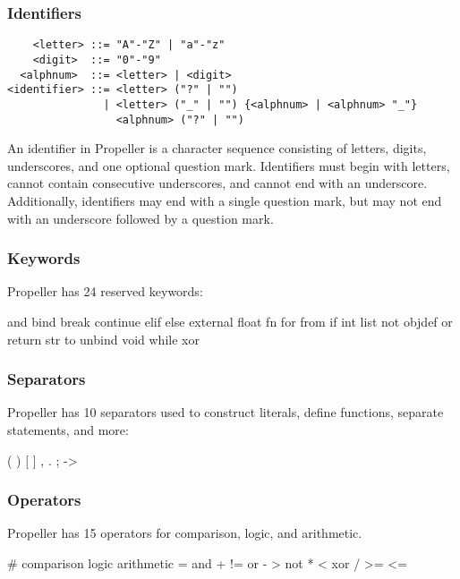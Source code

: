 \subsubsection{Identifiers}

\begin{verbatim}
    <letter> ::= "A"-"Z" | "a"-"z"
    <digit>  ::= "0"-"9"
  <alphnum>  ::= <letter> | <digit>
<identifier> ::= <letter> ("?" | "")
               | <letter> ("_" | "") {<alphnum> | <alphnum> "_"}
                 <alphnum> ("?" | "")
\end{verbatim}

\noindent
An identifier in Propeller is a character sequence consisting of letters, digits, underscores, and one
optional question mark. Identifiers must begin with letters, cannot contain consecutive underscores,
and cannot end with an underscore. Additionally, identifiers may end with a single question mark,
but may not end with an underscore followed by a question mark.

\subsubsection{Keywords}
Propeller has 24 reserved keywords:
\begin{mylisting}
and     bind     break  continue elif
else    external float  fn       for
from    if       int    list     not
objdef  or       return str      to
unbind  void     while  xor                     
\end{mylisting}

\subsubsection{Separators}
Propeller has 10 separators used to construct literals, define functions, separate statements, and
more:
\begin{mylisting}
( ) [ ] { }
, . ;   ->
\end{mylisting}

\subsubsection{Operators}
Propeller has 15 operators for comparison, logic, and arithmetic.
\begin{mylisting}
# comparison  logic  arithmetic
  =           and    +
  !=          or     -
  >           not    *
  <           xor    /
  >=                 %
  <=
\end{mylisting}

